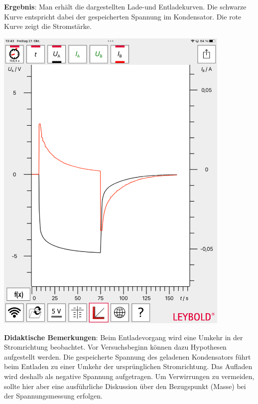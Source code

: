 \documentclass[../main.tex]{subfiles}
\begin{document}
\begin{tcolorbox}
\begin{minipage}[]{0.75\textwidth}
        \vspace{0.4cm}
    \textbf{Ergebnis}: Man erhält die dargestellten Lade-und Entladekurven. Die schwarze Kurve entspricht dabei der gespeicherten Spannung im Kondensator. Die rote Kurve zeigt die Stromstärke.
    \end{minipage}
    \begin{minipage}[]{0.24\textwidth}
        \vspace{-0.2cm}
        \begin{center}
            \includegraphics[width=0.85\textwidth]{img/cassy}
        \end{center}
    \end{minipage}
  
    \vspace{0.4cm}
    \textbf{Didaktische Bemerkungen}: Beim Entladevorgang wird eine Umkehr in der Stromrichtung beobachtet. Vor Versuchsbeginn können dazu Hypothesen aufgestellt werden. Die gespeicherte Spannung des geladenen Kondensators führt beim Entladen zu einer Umkehr der ursprünglichen Stromrichtung. Das Aufladen wird deshalb als \glqq negative Spannung\grqq{} aufgetragen. Um Verwirrungen zu vermeiden, sollte hier aber eine ausführliche Diskussion über den Bezugspunkt (Masse) bei der Spannungsmessung erfolgen.     
    

\end{tcolorbox}
\end{document}

